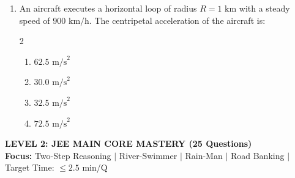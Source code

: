 \documentclass[11pt,a4paper]{article}
\begin{document}
\begin{enumerate}[label=\textbf{\textcolor{l1Green}{Q\arabic*.}},leftmargin=24pt,itemsep=10pt]
  \item An aircraft executes a horizontal loop of radius $R = 1\text{ km}$ with a steady speed of $900\text{ km/h}$. The centripetal acceleration of the aircraft is:
  \begin{multicols}{2}
  \begin{enumerate}[label=\textbf{\textcolor{primaryDark}{(\Alph*)}},itemsep=2pt]
    \item $62.5\text{ m/s}^2$
    \item $30.0\text{ m/s}^2$
    \item $32.5\text{ m/s}^2$
    \item $72.5\text{ m/s}^2$
  \end{enumerate}
  \end{multicols}

\end{enumerate}

\newpage

\begin{tcolorbox}[l2banner]
  {\Large \textbf{\textsf{LEVEL 2: JEE MAIN CORE MASTERY (25 Questions)}}}\\[2pt]
  {\footnotesize \textbf{Focus:} Two-Step Reasoning $\vert$ River-Swimmer $\vert$ Rain-Man $\vert$ Road Banking $\vert$ Target Time: $\le 2.5$ min/Q}
\end{tcolorbox}
\vspace{6pt}
\end{document}
